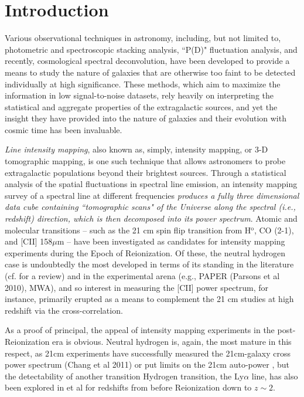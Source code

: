 \documentclass[12pt,preprint]{emulateapj}
\begin{document}
\section{Introduction}

Various observational techniques in astronomy, including, but not limited to, photometric and spectroscopic stacking analysis, ``P(D)" fluctuation analysis, and recently, cosmological spectral deconvolution, have been developed to provide a means to study the nature of galaxies that are otherwise too faint to be detected individually at high significance. These methods, which aim to maximize the information in low signal-to-noise datasets, rely heavily on interpreting the statistical and aggregate properties of the extragalactic sources, and yet the insight they have provided into the nature of galaxies and their evolution with cosmic time has been invaluable. 

\emph{Line intensity mapping}, also known as, simply, intensity mapping, or 3-D tomographic mapping, is one such technique that allows astronomers to probe extragalactic populations beyond their brightest sources. Through a statistical analysis of the spatial fluctuations in spectral line emission, an intensity mapping survey of a spectral line at different frequencies \emph{produces a fully three dimensional data cube containing ``tomographic scans" of the Universe along the spectral (i.e., redshift) direction, which is then decomposed into its power spectrum}. Atomic \cite{gong11cii,visbal11} and molecular \cite{lidz11,gong11co} transitions -- such as the 21 cm spin flip transition from H$^{\mathrm{o}}$, CO (2-1), and [CII] 158$\mu$m -- have been investigated as candidates for intensity mapping experiments during the Epoch of Reionization. Of these, the neutral hydrogen case is undoubtedly the most developed in terms of its standing in the literature (cf. \citet{FOB} for a review) and in the experimental arena (e.g., PAPER (Parsons et al 2010), MWA), and so interest in measuring the [CII] power spectrum, for instance, primarily erupted as a means to complement the 21 cm studies at high redshift via the cross-correlation. 

As a proof of principal, the appeal of intensity mapping experiments in the post-Reionization era is obvious. Neutral hydrogen is, again, the most mature in this respect, as 21cm experiments have successfully measured the 21cm-galaxy cross power spectrum (Chang et al 2011) or put limits on the 21cm auto-power \citep{switzer13}, but the detectability of another transition Hydrogen transition, the Ly$\alpha$ line, has also been explored in \citep{Pullen13} et al for redshifts from before Reionization down to $z \sim 2$. 
\end{document}
